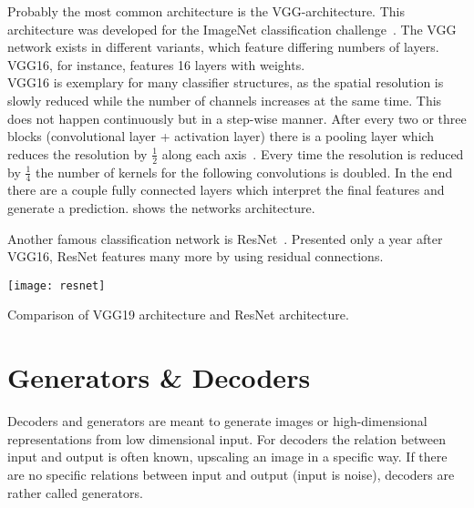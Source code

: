 Probably the most common architecture is the VGG-architecture.
This architecture was developed for the ImageNet classification challenge~\cite{imagenet}.
The VGG network exists in different variants, which feature differing numbers of layers.
VGG16, for instance, features 16 layers with weights.\\
VGG16 is exemplary for many classifier structures, as the spatial resolution is slowly reduced while the number of channels increases at the same time.
This does not happen continuously but in a step-wise manner.
After every two or three blocks (convolutional layer + activation layer) there is a pooling layer which reduces the resolution by $\frac{1}{2}$ along each axis~\cite{VGG}.
Every time the resolution is reduced by $\frac{1}{4}$ the number of kernels for the following convolutions is doubled.
In the end there are a couple fully connected layers which interpret the final features and generate a prediction.
 shows the networks architecture.
%    


Another famous classification network is ResNet~\cite{resnet}.
Presented only a year after VGG16, ResNet features many more by using residual connections.

\begin{marginfigure}
    \texttt{[image: resnet]}
    \caption[]{Comparison of VGG19 architecture and ResNet architecture.}
\end{marginfigure}

\section{Generators \& Decoders}
Decoders and generators are meant to generate images or high-dimensional representations from low dimensional input.
For decoders the relation between input and output is often known, upscaling an image in a specific way.
If there are no specific relations between input and output (input is noise), decoders are rather called generators.

